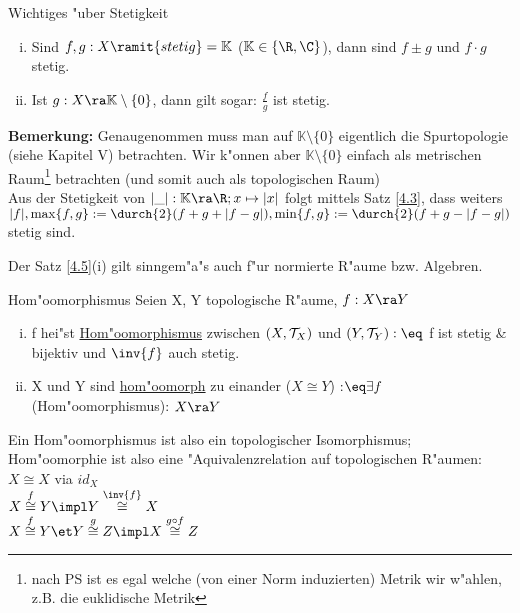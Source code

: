 \begin{satz}\label{4.5}{\sc Wichtiges "uber Stetigkeit}
\begin{enumerate}[(i)]
\item Sind $f,g:X\ramit{stetig}=\mathbb{K}$ ($\mathbb{K}\in\{\R ,\C\}$), dann sind $f\pm g$ und $f\cdot g$ stetig.
\item Ist $g:X\ra\mathbb{K}\setminus\{ 0\}$, dann gilt sogar: $\frac{f}{g}$ ist stetig.
\end{enumerate}
{\bf Bemerkung:} Genaugenommen muss man auf $\mathbb{K}\setminus\{ 0\}$ eigentlich die Spurtopologie (siehe Kapitel V) betrachten. Wir k"onnen aber $\mathbb{K}\setminus\{ 0\}$ einfach als metrischen Raum\footnote{nach PS ist es egal welche (von einer Norm induzierten) Metrik wir w"ahlen, z.B. die euklidische Metrik} betrachten (und somit auch als topologischen Raum)\\
Aus der Stetigkeit von $|\_ |: \mathbb{K}\ra\R ;x\mapsto |x|$ folgt mittels Satz \ref{4.3}, dass weiters $| f |, \max\{ f,g\} :=\durch{2} (f+g+|f-g|), \min\{ f,g\} := \durch{2}(f+g-|f-g|)$ stetig sind.
\end{satz}
Der Satz \ref{4.5}(i) gilt sinngem"a"s auch f"ur normierte R"aume bzw. Algebren.
\begin{definition}\label{4.6}{Hom"oomorphismus}
Seien X, Y topologische R"aume, $f:X\ra Y$
\begin{enumerate}[(i)]
\item f hei"st \ul{Hom"oomorphismus} zwischen $(X,\mathcal T_X)$ und $(Y,\T_Y):\eq$ f ist stetig \& bijektiv und $\inv{f}$ auch stetig.
\item X und Y sind \ul{hom"oomorph} zu einander ($X\cong Y$) :$\eq \exists f$ (Hom"oomorphismus): $X\ra Y$
\end{enumerate}
Ein Hom"oomorphismus ist also ein topologischer Isomorphismus; Hom"oomorphie ist also eine "Aquivalenzrelation auf topologischen R"aumen:\\
$X\cong X$ via $id_X$\\
$X\stackrel{f}{\cong}Y\impl Y\stackrel{\inv{f}}{\cong}X$\\
$X\stackrel{f}{\cong}Y \et Y\stackrel{g}{\cong}Z\impl X\stackrel{g\circ f}{\cong}Z$
\end{definition}
